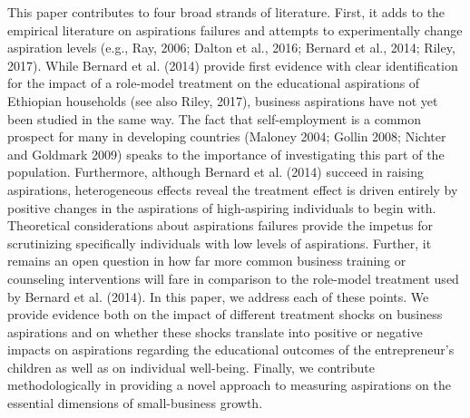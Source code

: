 \documentclass[11.5pt]{article}
\begin{document}
This paper contributes to four broad strands of literature. First, it adds to the empirical literature on aspirations failures and attempts to experimentally change aspiration levels (e.g., Ray, 2006; Dalton et al., 2016; Bernard et al., 2014; Riley, 2017). While Bernard et al. (2014) provide first evidence with clear identification for the impact of a role-model treatment on the educational aspirations of Ethiopian households (see also Riley, 2017), business aspirations have not yet been studied in the same way. The fact that self-employment is a common prospect for many in developing countries (Maloney 2004; Gollin 2008; Nichter and Goldmark 2009) speaks to the importance of investigating this part of the population. Furthermore, although Bernard et al. (2014) succeed in raising aspirations, heterogeneous effects reveal the treatment effect is driven entirely by positive changes in the aspirations of high-aspiring individuals to begin with. Theoretical considerations about aspirations failures provide the impetus for scrutinizing specifically individuals with low levels of aspirations. Further, it remains an open question in how far more common business training or counseling interventions will fare in comparison to the role-model treatment used by Bernard et al. (2014). In this paper, we address each of these points. We provide evidence both on the impact of different treatment shocks on business aspirations and on whether these shocks translate into positive or negative impacts on aspirations regarding the educational outcomes of the entrepreneur's children as well as on individual well-being. Finally, we contribute methodologically in providing a novel approach to measuring aspirations on the essential dimensions of small-business growth.
\end{document}
